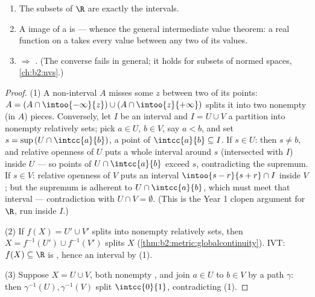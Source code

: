 \begin{theorem}\label{thm:b2:metric:connectedness}
\begin{enumerate}
  \item The  subsets of $\R$ are exactly the intervals.
  \item A  image of a  is  ---
        whence the general intermediate value theorem: a 
        real function on a  takes every value between
        any two of its values.
  \item {} $\Rightarrow$ . (The converse fails
        in general; it holds for  subsets of normed spaces,
        \cref{ch:b2:nvs}.)
\end{enumerate}
\end{theorem}

\begin{proof}
(1) A non-interval $A$ misses some $z$ between two of its points:
$A = (A \cap \intoo{-\infty}{z}) \cup (A \cap \intoo{z}{+\infty})$
splits it into two nonempty  (in $A$) pieces. Conversely, let
$I$ be an interval and $I = U \cup V$ a partition into nonempty
relatively  sets; pick $a \in U$, $b \in V$, say $a < b$, and
set $s = \sup\,(U \cap \intcc{a}{b})$, a point of $\intcc{a}{b}
\subseteq I$. If $s \in U$: then $s \neq b$, and relative openness
of $U$ puts a whole interval around $s$ (intersected with $I$)
inside $U$ --- so points of $U \cap \intcc{a}{b}$ exceed $s$,
contradicting the supremum. If $s \in V$: relative openness of $V$
puts an interval $\intoo{s - r}{s + r} \cap I$ inside $V$; but the
supremum is adherent to $U \cap \intcc{a}{b}$, which must meet that
interval --- contradiction with $U \cap V = \emptyset$. (This is
the Year 1 clopen argument for $\R$, run inside $I$.)

(2) If $f(X) = U' \cup V'$ splits into nonempty relatively 
sets, then $X = f^{-1}(U') \cup f^{-1}(V')$ splits $X$
(\cref{thm:b2:metric:globalcontinuity}). IVT: $f(X) \subseteq \R$
is , hence an interval by (1).

(3) Suppose $X = U \cup V$, both nonempty , and join $a \in U$
to $b \in V$ by a path $\gamma$: then $\gamma^{-1}(U),
\gamma^{-1}(V)$ split $\intcc{0}{1}$, contradicting (1).
\end{proof}

